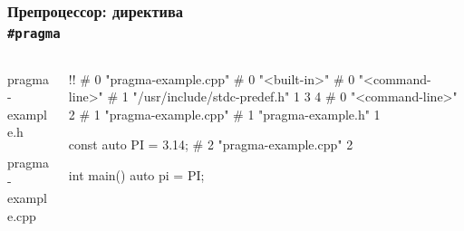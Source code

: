 \documentclass[compress]{beamer}
\begin{document}
\begin{frame}[fragile]

    \frametitle{Препроцессор: директива \\ \texttt{\#pragma}}

    \begin{columns}[T]

        \begin{column}{0.5\textwidth}

                {pragma-example.h}

                {pragma-example.cpp}

        \end{column}

        \begin{column}{0.5\textwidth}

            \begin{terminalwindow}
!!
# 0 "pragma-example.cpp"
# 0 "<built-in>"
# 0 "<command-line>"
# 1 "/usr/include/stdc-predef.h" 1 3 4
# 0 "<command-line>" 2
# 1 "pragma-example.cpp"
# 1 "pragma-example.h" 1


const auto PI = 3.14;
# 2 "pragma-example.cpp" 2




int main() {
    auto pi = PI;
}
            \end{terminalwindow}

        \end{column}

    \end{columns}

\end{frame}
\end{document}
